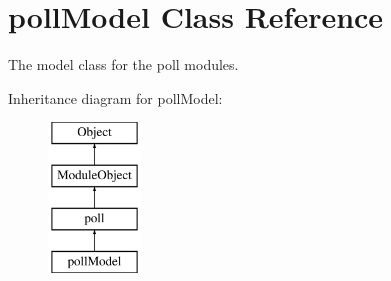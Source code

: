 \hypertarget{classpollModel}{\section{poll\-Model Class Reference}
\label{classpollModel}
}


The model class for the poll modules.  


Inheritance diagram for poll\-Model\-:\begin{figure}[H]
\begin{center}
\leavevmode
\includegraphics[height=4.000000cm]{classpollModel}
\end{center}
\end{figure}
